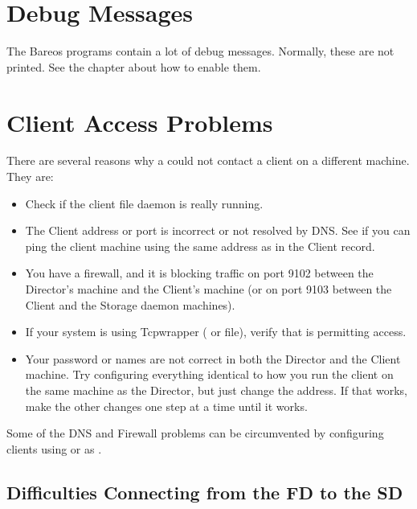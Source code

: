 
\section{Debug Messages}
\label{sec:debug-messages}

The Bareos programs contain a lot of debug messages. Normally, these are not printed.
See the  chapter about how to enable them.


\section{Client Access Problems}
\label{AccessProblems}
   There are several reasons why a \bareosDir could not contact a client  on a
   different machine. They are:

\begin{itemize}
\item Check if the client file daemon is really running.
\item The Client address or port is incorrect or not resolved by  DNS. See if
   you can ping the client machine using the same  address as in the Client
   record.  
\item You have a firewall, and it is blocking traffic on port  9102 between
   the Director's machine and the Client's  machine (or on port 9103 between the
   Client and the Storage daemon  machines). 
\item If your system is using Tcpwrapper ( or  file), verify that is
   permitting access.
\item Your password or names are not correct in both the Director and  the
   Client machine. Try configuring everything identical to  how you run the
   client on the same machine as the Director, but  just change the address. If
   that works, make the other changes  one step at a time until it works.  
\end{itemize}

Some of the DNS and Firewall problems can be circumvented by configuring clients
using  or
as .



\subsection{Difficulties Connecting from the FD to the SD}

